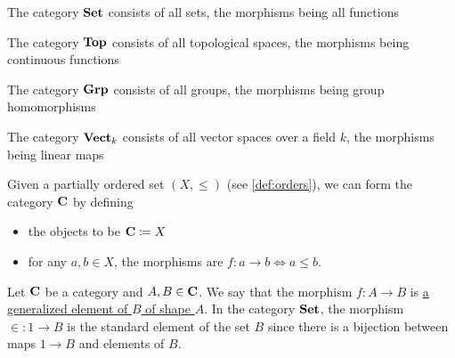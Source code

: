 \begin{definition}\label{def:standard_categories}
  \begin{defenum}
    \item\label{def:standard_categories/set} The category $\operatorname{\mathbf{Set}}$ consists of all sets, the morphisms being all functions
    \item\label{def:standard_categories/top} The category $\operatorname{\mathbf{Top}}$ consists of all topological spaces, the morphisms being continuous functions
    \item\label{def:standard_categories/grp} The category $\operatorname{\mathbf{Grp}}$ consists of all groups, the morphisms being group homomorphisms
    \item\label{def:standard_categories/vect} The category $\operatorname{\mathbf{Vect}}_k$ consists of all vector spaces over a field $k$, the morphisms being linear maps
    \item\label{def:standard_categories/ord} Given a partially ordered set $(X, \leq)$ (see \cref{def:orders}), we can form the category $\operatorname{\mathbf{C}}$ by defining
    \begin{itemize}
      \item the objects to be $\operatorname{\mathbf{C}} \coloneqq X$
      \item for any $a, b \in X$, the morphisms are $f: a \to b \iff a \leq b$.
    \end{itemize}
  \end{defenum}
\end{definition}

\begin{definition}\label{def:generalized_element}\cite[definition 4.1.25]{Leinster2014}
  Let $\operatorname{\mathbf{C}}$ be a category and $A, B \in \operatorname{\mathbf{C}}$. We say that the morphism $f: A \to B$ is \uline{a generalized element of $B$ of shape $A$}. In the category $\operatorname{\mathbf{Set}}$, the morphism $\in : 1 \to B$ is the standard element of the set $B$ since there is a bijection between maps $1 \to B$ and elements of $B$.
\end{definition}

